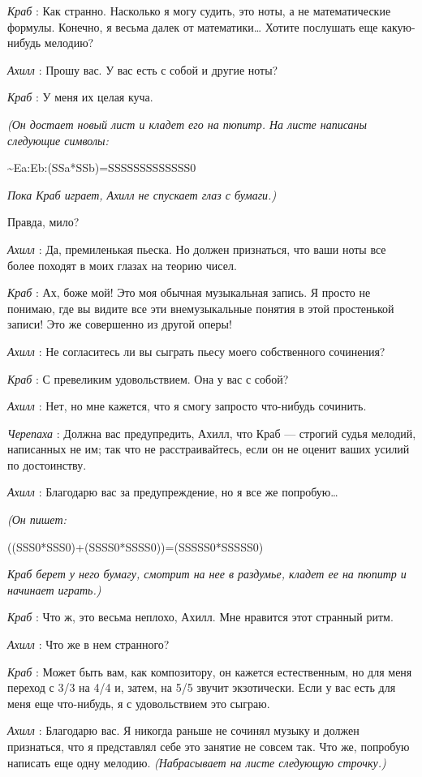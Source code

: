 \emph{Краб} : Как странно. Насколько я могу судить, это ноты, а не математические формулы. Конечно, я весьма далек от математики\ldots{} Хотите послушать еще какую-нибудь мелодию?

\emph{Ахилл} : Прошу вас. У вас есть с собой и другие ноты?

\emph{Краб} : У меня их целая куча.

\emph{(Он достает новый лист и кладет его на пюпитр. На листе написаны следующие символы:}

\textasciitilde Ea:Eb:(SSa*SSb)=SSSSSSSSSSSSS0

\emph{Пока Краб играет, Ахилл не спускает глаз с бумаги.)}

Правда, мило?

\emph{Ахилл} : Да, премиленькая пьеска. Но должен признаться, что ваши ноты все более походят в моих глазах на теорию чисел.

\emph{Краб} : Ах, боже мой! Это моя обычная музыкальная запись. Я просто не понимаю, где вы видите все эти внемузыкальные понятия в этой простенькой записи! Это же совершенно из другой оперы!

\emph{Ахилл} : Не согласитесь ли вы сыграть пьесу моего собственного сочинения?

\emph{Краб} : С превеликим удовольствием. Она у вас с собой?

\emph{Ахилл} : Нет, но мне кажется, что я смогу запросто что-нибудь сочинить.

\emph{Черепаха} : Должна вас предупредить, Ахилл, что Краб --- строгий судья мелодий, написанных не им; так что не расстраивайтесь, если он не оценит ваших усилий по достоинству.

\emph{Ахилл} : Благодарю вас за предупреждение, но я все же попробую\ldots{}

\emph{(Он пишет:}

((SSS0*SSS0)+(SSSS0*SSSS0))=(SSSSS0*SSSSS0)

\emph{Краб берет у него бумагу, смотрит на нее в раздумье, кладет ее на пюпитр и начинает играть.)}

\emph{Краб} : Что ж, это весьма неплохо, Ахилл. Мне нравится этот странный ритм.

\emph{Ахилл} : Что же в нем странного?

\emph{Краб} : Может быть вам, как композитору, он кажется естественным, но для меня переход с 3/3 на 4/4 и, затем, на 5/5 звучит экзотически. Если у вас есть для меня еще что-нибудь, я с удовольствием это сыграю.

\emph{Ахилл} : Благодарю вас. Я никогда раньше не сочинял музыку и должен признаться, что я представлял себе это занятие не совсем так. Что же, попробую написать еще одну мелодию. \emph{(Набрасывает на листе следующую строчку.)}

